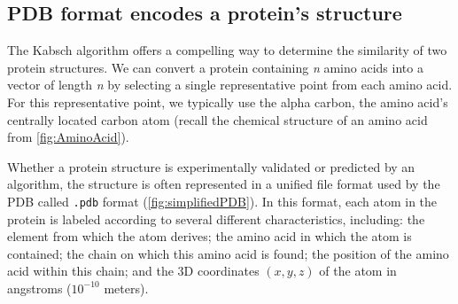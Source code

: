 \subsection{PDB format encodes a protein's structure}

The Kabsch algorithm offers a compelling way to determine the similarity of two protein structures. We can convert a protein containing \textit{n} amino acids into a vector of length \textit{n} by selecting a single representative point from each amino acid. For this representative point, we typically use the alpha carbon, the amino acid's centrally located carbon atom (recall the chemical structure of an amino acid from \autoref{fig:AminoAcid}).

Whether a protein structure is experimentally validated or predicted by an algorithm, the structure is often represented in a unified file format used by the PDB called \texttt{.pdb} format (\autoref{fig:simplifiedPDB}). In this format, each atom in the protein is labeled according to several different characteristics, including: the element from which the atom derives; the amino acid in which the atom is contained; the chain on which this amino acid is found; the position of the amino acid within this chain; and the 3D coordinates $(x, y, z)$ of the atom in angstroms ($10^{-10}$ meters).\\

